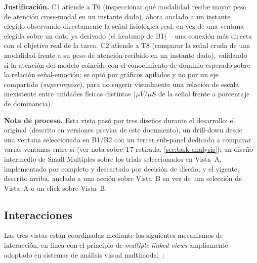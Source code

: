 \textbf{Justificación.} C1 atiende a T6 (inspeccionar qué modalidad recibe mayor peso de atención cross-modal en un instante dado), ahora anclado a un instante elegido observando directamente la señal fisiológica real, en vez de una ventana elegida sobre un dato ya derivado (el heatmap de B1) -- una conexión más directa con el objetivo real de la tarea. C2 atiende a T8 (comparar la señal cruda de una modalidad frente a su peso de atención recibido en un instante dado), validando si la atención del modelo coincide con el conocimiento de dominio esperado sobre la relación señal-emoción; se optó por gráficos apilados y no por un eje compartido (\textit{superimpose}), para no sugerir visualmente una relación de escala inexistente entre unidades físicas distintas ($\mu V$/$\mu S$ de la señal frente a porcentaje de dominancia).

\textbf{Nota de proceso.} Esta vista pasó por tres diseños durante el desarrollo: el original (descrito en versiones previas de este documento), un drill-down desde una ventana seleccionada en B1/B2 con un tercer sub-panel dedicado a comparar varias ventanas entre sí (ver nota sobre T7 retirada, \cref{sec:task-analysis}); un diseño intermedio de Small Multiples sobre los trials seleccionados en Vista~A, implementado por completo y descartado por decisión de diseño; y el vigente, descrito arriba, anclado a una acción sobre Vista~B en vez de una selección de Vista~A o un click sobre Vista~B.

\subsection{Interacciones}
\label{sec:interacciones}

Las tres vistas están coordinadas mediante los siguientes mecanismos de interacción, en línea con el principio de \textit{multiple linked views} ampliamente adoptado en sistemas de análisis visual multimodal~\cite{Emoco2019}:

